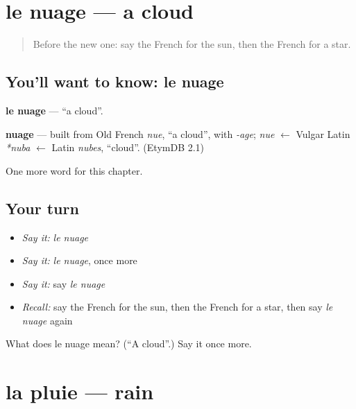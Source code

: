 \section[le nuage]{le nuage — a cloud}

\label{lesson:FR-C83-nuage}



\begin{quote}
Before the new one: say the French for the sun, then the French for a star.
\end{quote}

\subsection*{You'll want to know: le nuage}
\textbf{le nuage} — \textquotedblleft{}a cloud\textquotedblright{}.

\begin{cousinweb}
\textbf{nuage} — built from Old French \emph{nue}, \textquotedblleft{}a cloud\textquotedblright{}, with \emph{-age}; \emph{nue} $\leftarrow$ Vulgar Latin \emph{*nuba} $\leftarrow$ Latin \emph{nubes}, \textquotedblleft{}cloud\textquotedblright{}. (EtymDB 2.1)
\end{cousinweb}

\begin{grammarlens}[title={What you've built}]
One more word for this chapter.
\end{grammarlens}

\subsection*{Your turn}
\begin{itemize}
\raggedright
  \item \emph{Say it:} \emph{le nuage}
  \item \emph{Say it:} \emph{le nuage}, once more
  \item \emph{Say it:} say \emph{le nuage}
  \item \emph{Recall:} say the French for the sun, then the French for a star, then say \emph{le nuage} again
\end{itemize}

\begin{tcolorbox}[breakable,colback=teal!4,colframe=teal!35!black,title={Before you move on}]
What does le nuage mean? (\textquotedblleft{}A cloud\textquotedblright{}.) Say it once more.
\end{tcolorbox}
\section[la pluie]{la pluie — rain}

